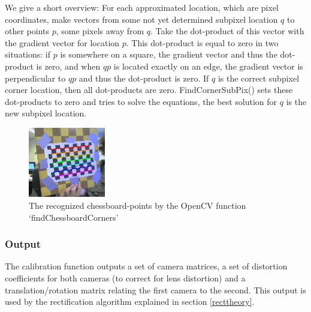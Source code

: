\documentclass[a4paper]{article}
\begin{document}
We give a short overview:
For each approximated location, which are pixel coordinates, make vectors
from some not yet determined subpixel location $q$ to other points $p$,
some pixels away from $q$. Take the dot-product of this vector with
the gradient vector for location $p$. This dot-product is equal
to zero in two situations: if $p$ is somewhere on a square, the gradient
vector and thus the dot-product is zero, and when $qp$ is located exactly
on an edge, the gradient vector is perpendicular to $qp$ and thus the
dot-product is zero. If $q$ is the correct subpixel corner location, then
all dot-products are zero. FindCornerSubPix() sets these dot-products to
zero and tries to solve the equations, the best solution for $q$ is the
new subpixel location.



\begin{figure} [h!tb]
\centering
  \includegraphics[width=0.3\textwidth]{chessboardcorners}
  \caption{The recognized chessboard-points by the OpenCV function
`findChessboardCorners'\label{chessboardcorners}}
\end{figure}

\subsubsection{Output} The calibration function outputs a set of
camera matrices, a set of distortion coefficients for both cameras (to
correct for lens distortion) and a translation/rotation matrix
relating the first camera to the second. This output is used by the
rectification algorithm explained in section \ref{recttheory}.
\end{document}
